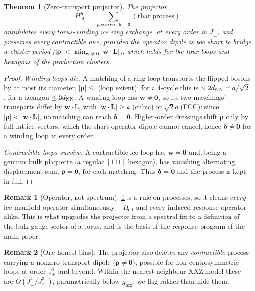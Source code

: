\documentclass[11pt,letterpaper]{article}
\newcommand{\Jpm}{J_{\pm}}
\newcommand{\Jzz}{J_{zz}}
\newcommand{\bw}{\mathbf{w}}
\newcommand{\bL}{\mathbf{L}}
\newcommand{\brho}{\bm{\rho}}
\newcommand{\bdelta}{\bm{\delta}}
\newcommand{\Heff}{H_{\mathrm{eff}}}
\newcommand{\ghex}{g_{\mathrm{hex}}}
\theoremstyle{plain}
\newtheorem{theorem}{Theorem}
\theoremstyle{definition}
\newtheorem{remark}{Remark}
\begin{document}
\begin{theorem}[Zero-transport projector]
\label{thm:transport}
The projector
\begin{equation}
\Heff^{\bdelta}=\!\!\sum_{\text{processes}:\ \bdelta=\bm0}\!\!(\text{that process})
\end{equation}
annihilates every torus-winding ice ring exchange, at every order in
$\Jpm$, and preserves every contractible one, provided the operator
dipole is too short to bridge a cluster period ($|\brho|<\min_{\bw\ne\bm
0}|\bw\cdot\bL|$), which holds for the four-loops and hexagons of the
production clusters.
\end{theorem}

\begin{proof}
\emph{Winding loops die.} A matching of a ring loop transports the
flipped bosons by at most its diameter, $|\brho|\le$ (loop extent);
for a $4$-cycle this is $\le2d_{\rm NN}=a/\sqrt2$, for a hexagon
$\le3d_{\rm NN}$. A winding loop has $\bw\ne\bm0$, so its two matchings'
transports differ by $\bw\cdot\bL$, with
$|\bw\cdot\bL|\ge a$ (cubic) or $\sqrt2 a$ (FCC): since $|\brho|<
|\bw\cdot\bL|$, no matching can reach $\bdelta=\bm0$. Higher-order
dressings shift $\brho$ only by full lattice vectors, which the
short operator dipole cannot cancel; hence $\bdelta\ne\bm0$ for a
winding loop at every order.

\emph{Contractible loops survive.} A contractible ice loop has
$\bw=\bm0$ and, being a genuine bulk plaquette (a regular $[111]$
hexagon), has vanishing alternating displacement sum, $\brho=\bm0$, for
each matching. Thus $\bdelta=\bm0$ and the process is kept in full.
\end{proof}

\begin{remark}[Operator, not spectrum]
\cref{thm:transport} is a rule on processes, so it cleans \emph{every}
ice-manifold operator simultaneously -- $\Heff$ and every induced
response operator alike. This is what upgrades the projector from a
spectral fix to a definition of the bulk gauge sector of a torus, and is
the basis of the response program of the main paper.
\end{remark}

\begin{remark}[One honest bias]
The projector also deletes any \emph{contractible} process carrying a
nonzero transport dipole ($\brho\ne\bm0$), possible for
non-centrosymmetric loops at order $\Jpm^4$ and beyond. Within the
nearest-neighbour XXZ model these are $O(\Jpm^4/\Jzz^3)$, parametrically
below $\ghex$; we flag rather than hide them.
\end{remark}
\end{document}
